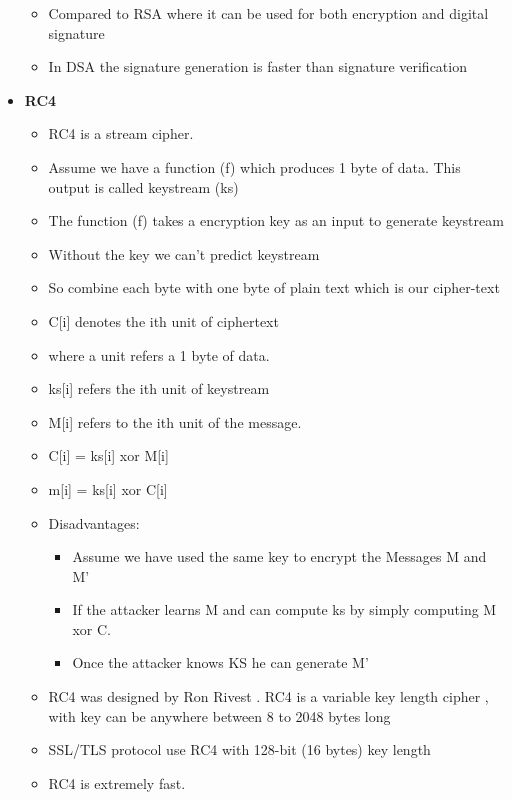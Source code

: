 \documentclass[12pt]{report}
\begin{document}
\begin{itemize}
\begin{itemize}
            \item Compared to RSA where it can be used for both encryption and digital signature
            \item In DSA the signature generation is faster than signature verification
        \end{itemize}
    \item \textbf{RC4}
        \begin{itemize}
            \item RC4 is a stream cipher.
            \item Assume we have a function (f) which produces 1 byte of data. 
                This output is called keystream (ks)
            \item The function (f) takes a encryption key as an input to generate keystream
            \item Without the key we can't predict keystream
            \item So combine each byte with one byte of plain text which is our cipher-text
            \item C[i] denotes the ith unit of ciphertext 
            \item where a unit refers a 1 byte of data.
            \item ks[i] refers the ith unit of keystream
            \item M[i] refers to the ith unit of the message.
            \item C[i] = ks[i] xor M[i]
            \item m[i] = ks[i] xor C[i] 
            \item Disadvantages:
                \begin{itemize}
                    \item Assume we have used the same key to encrypt the Messages M and M' 
                    \item If the attacker learns M and can compute ks by simply computing M xor C.
                    \item Once the attacker knows KS he can generate M'
                \end{itemize}
            \item RC4 was designed by Ron Rivest . RC4 is a variable key length cipher , with key can be
                anywhere between 8 to 2048 bytes long
            \item SSL/TLS protocol use RC4 with 128-bit (16 bytes) key length
            \item RC4 is extremely fast. 

\end{itemize}
\end{itemize}
\end{document}

